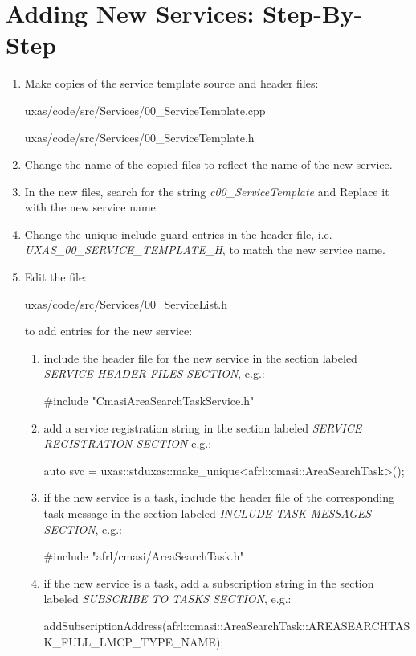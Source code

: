 \section{Adding New Services: Step-By-Step}
\begin{enumerate}
\item Make copies of the service template source and header files:
\begin{docspec}
    uxas/code/src/Services/00\_ServiceTemplate.cpp
\end{docspec}
\begin{docspec}
    uxas/code/src/Services/00\_ServiceTemplate.h
\end{docspec}
\item Change the name of the copied files to reflect the name of the new service.
\item In the new files, search for the string \textit{c00\_ServiceTemplate} and Replace it with the new service name.
\item Change the unique include guard entries in the header file, i.e. \textit{UXAS\_00\_SERVICE\_TEMPLATE\_H}, to match the new service name.
\item Edit the file:
\begin{docspec}
    uxas/code/src/Services/00\_ServiceList.h
\end{docspec}
to add entries for the new service:
\begin{enumerate}
  \item include the header file for the new service in the section labeled \textit{SERVICE HEADER FILES SECTION}, e.g.:
\begin{docspec}
\#include "CmasiAreaSearchTaskService.h"
\end{docspec}
  
  \item add a service registration string in the section labeled \textit{SERVICE REGISTRATION SECTION} e.g.:
\begin{docspec}
{auto svc = uxas::stduxas::make\_unique<afrl::cmasi::AreaSearchTask>();}
\end{docspec}
  \item if the new service is a task, include the header file of the corresponding task message in the section labeled \textit{INCLUDE TASK MESSAGES SECTION}, e.g.:
\begin{docspec}
\#include "afrl/cmasi/AreaSearchTask.h"
\end{docspec} 
  \item if the new service is a task, add a subscription string in the section labeled \textit{SUBSCRIBE TO TASKS SECTION}, e.g.:
\begin{docspec}
addSubscriptionAddress(afrl::cmasi::AreaSearchTask::AREASEARCHTASK\_FULL\_LMCP\_TYPE\_NAME);
\end{docspec} 
  \end{enumerate}  
\end{enumerate}


